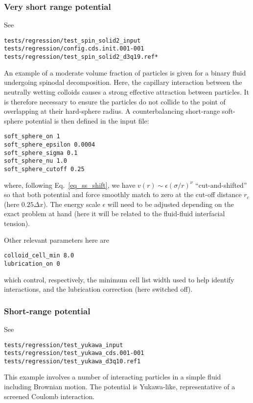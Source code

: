 \subsubsection{Very short range potential}

See
\begin{verbatim}
tests/regression/test_spin_solid2_input
tests/regression/config.cds.init.001-001
tests/regression/test_spin_solid2_d3q19.ref*
\end{verbatim}

An example of a moderate volume fraction of particles is given for
a binary fluid undergoing spinodal decomposition. Here,
the capillary interaction between the neutrally wetting colloids
causes a strong effective attraction between particles. It is therefore
necessary to ensure the particles do not collide to the point of
overlapping at their hard-sphere radius. A counterbalancing short-range
soft-sphere potential is then defined in the input file:
\begin{verbatim}
soft_sphere_on 1
soft_sphere_epsilon 0.0004
soft_sphere_sigma 0.1
soft_sphere_nu 1.0
soft_sphere_cutoff 0.25
\end{verbatim}
where, following Eq.~\ref{eq_ss_shift}, we have
$v(r) \sim \epsilon (\sigma /r)^\nu$ ``cut-and-shifted'' so that
both potential and force smoothly match to zero at the cut-off
distance $r_c$ (here $0.25\Delta x$). The energy scale $\epsilon$
will need to be adjusted depending on the exact problem at hand
(here it will be related to the fluid-fluid interfacial tension).

Other relevant parameters here are
\begin{verbatim}
colloid_cell_min 8.0
lubrication_on 0
\end{verbatim}
which control, respectively, the minimum cell list width used to
help identify interactions, and the lubrication correction (here
switched off).


\subsubsection{Short-range potential}

See
\begin{verbatim}
tests/regression/test_yukawa_input
tests/regression/test_yukawa_cds.001-001
tests/regression/test_yukawa_d3q10.ref1
\end{verbatim}

This example involves a number of interacting particles in a simple
fluid including Brownian motion. The potential is Yukawa-like,
representative of a screened Coulomb interaction.

